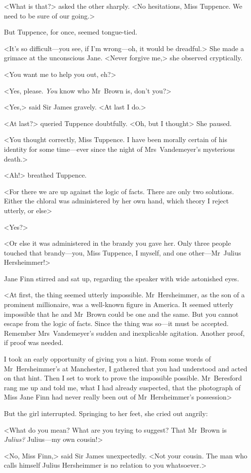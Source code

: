 <What is that?> asked the other sharply. <No hesitations, Miss Tuppence. We need to be sure of our going.>

But Tuppence, for once, seemed tongue-tied.

<It's so difficult—you see, if I'm wrong—oh, it would be dreadful.> She made a grimace at the unconscious Jane. <Never forgive me,> she observed cryptically.

<You want me to help you out, eh?>

<Yes, please. \textit{You} know who Mr~Brown is, don't you?>

<Yes,> said Sir James gravely. <At last I do.>

<At last?> queried Tuppence doubtfully. <Oh, but I thought\longdash> She paused.

<You thought correctly, Miss Tuppence. I have been morally certain of his identity for some time—ever since the night of Mrs~Vandemeyer's mysterious death.>

<Ah!> breathed Tuppence.

<For there we are up against the logic of facts. There are only two solutions. Either the chloral was administered by her own hand, which theory I reject utterly, or else\longdash>

<Yes?>

<Or else it was administered in the brandy you gave her. Only three people touched that brandy—you, Miss Tuppence, I myself, and one other—Mr~Julius Hersheimmer!>

Jane Finn stirred and sat up, regarding the speaker with wide astonished eyes.

<At first, the thing seemed utterly impossible. Mr~Hersheimmer, as the son of a prominent millionaire, was a well-known figure in America. It seemed utterly impossible that he and Mr~Brown could be one and the same. But you cannot escape from the logic of facts. Since the thing was so—it must be accepted. Remember Mrs~Vandemeyer's sudden and inexplicable agitation. Another proof, if proof was needed.

I took an early opportunity of giving you a hint. From some words of Mr~Hersheimmer's at Manchester, I gathered that you had understood and acted on that hint. Then I set to work to prove the impossible possible. Mr~Beresford rang me up and told me, what I had already suspected, that the photograph of Miss Jane Finn had never really been out of Mr~Hersheimmer's possession\longdash>

But the girl interrupted. Springing to her feet, she cried out angrily:

<What do you mean? What are you trying to suggest? That Mr~Brown is \emph{Julius?} Julius—my own cousin!>

<No, Miss Finn,> said Sir James unexpectedly. <Not your cousin. The man who calls himself Julius Hersheimmer is no relation to you whatsoever.> 